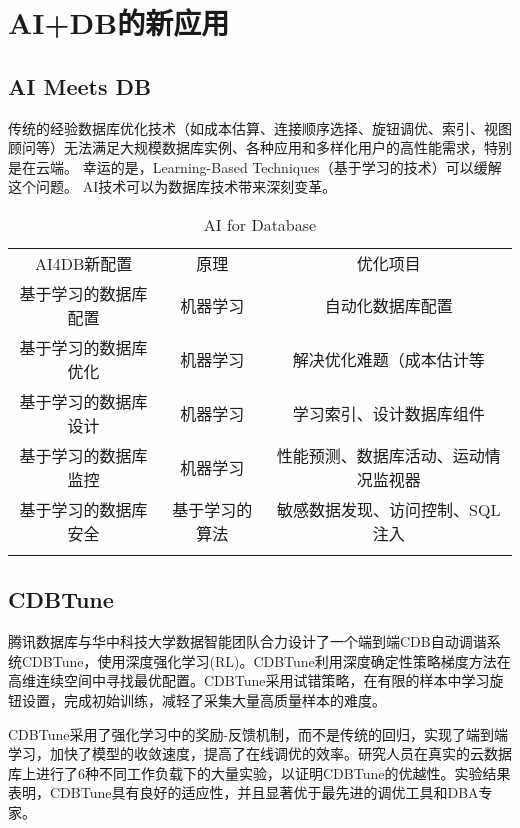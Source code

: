 \documentclass[a4paper,12pt]{article}
\begin{document}
\section{AI+DB的新应用}

\subsection{AI Meets DB}
传统的经验数据库优化技术（如成本估算、连接顺序选择、旋钮调优、索引、视图顾问等）无法满足大规模数据库实例、各种应用和多样化用户的高性能需求，特别是在云端。
幸运的是，Learning-Based Techniques（基于学习的技术）可以缓解这个问题\cite{07}。
AI技术可以为数据库技术带来深刻变革。
\begin{table}[htbp]%
	\centering
	\label{tab:1}  
	\begin{tabular}{ccc}%
		\hline\hline\noalign{\smallskip}	
		AI4DB新配置 & 原理 & 优化项目  \\
		\noalign{\smallskip}\hline\noalign{\smallskip}
		基于学习的数据库配置 & 机器学习 & 自动化数据库配置\\
		基于学习的数据库优化 & 机器学习 & 解决优化难题（成本估计等\\
		基于学习的数据库设计 & 机器学习 & 学习索引、设计数据库组件\\
		基于学习的数据库监控 & 机器学习 & 性能预测、数据库活动、运动情况监视器\\
		基于学习的数据库安全 & 基于学习的算法 & 敏感数据发现、访问控制、SQL注入\\
		\noalign{\smallskip}\hline	
	\end{tabular}
	\caption{AI for Database\cite{04}}
\end{table}

\subsection{CDBTune}
腾讯数据库与华中科技大学数据智能团队合力设计了一个端到端CDB自动调谐系统CDBTune，使用深度强化学习(RL)。CDBTune利用深度确定性策略梯度方法在高维连续空间中寻找最优配置。CDBTune采用试错策略，在有限的样本中学习旋钮设置，完成初始训练，减轻了采集大量高质量样本的难度\cite{05}。

CDBTune采用了强化学习中的奖励-反馈机制，而不是传统的回归，实现了端到端学习，加快了模型的收敛速度，提高了在线调优的效率。研究人员在真实的云数据库上进行了6种不同工作负载下的大量实验，以证明CDBTune的优越性。实验结果表明，CDBTune具有良好的适应性，并且显著优于最先进的调优工具和DBA专家\cite{07}。
\end{document}
